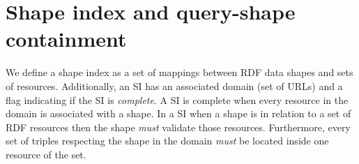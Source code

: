 \section{Shape index and query-shape containment}


We define a shape index as a set of mappings between RDF data shapes and sets of resources.
Additionally, an SI has an associated domain (set of URLs)
and a flag indicating if the SI is \emph{complete}.
A SI is complete when every resource in the domain is associated with a shape.
In a SI when a shape is in relation to a set of RDF resources then the shape \emph{must} validate those resources.
Furthermore, every set of triples respecting the shape in the domain \emph{must} be located inside one resource of the set.

